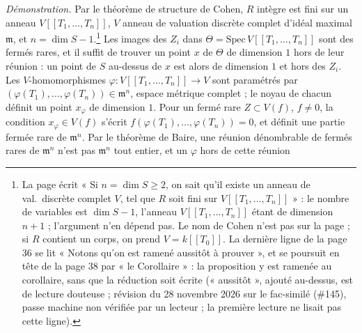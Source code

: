 \documentclass[11pt,a4paper]{article}
\begin{document}
\emph{Démonstration.} Par le théorème de structure de Cohen, $R$ intègre est
fini sur un anneau $V[[T_1, \ldots, T_n]]$, $V$ anneau de valuation discrète
complet d'idéal maximal $\mathfrak{m}$, et $n = \dim S - 1$.\footnote{La page
écrit « Si $n = \dim S \geq 2$, on sait qu'il existe un anneau de val.\
discrète complet $V$, tel que $R$ soit fini sur $V[[T_1, \ldots, T_n]]$ » :
le nombre de variables est $\dim S - 1$, l'anneau $V[[T_1, \ldots, T_n]]$
étant de dimension $n + 1$ ; l'argument n'en dépend pas. Le nom de Cohen
n'est pas sur la page ; si $R$ contient un corps, on prend $V = k[[T_0]]$.
La dernière ligne de la page 36 se lit « Notons qu'on est ramené aussitôt à
prouver », et se poursuit en tête de la page 38 par « le Corollaire » : la
proposition y est ramenée au corollaire, sans que la réduction soit écrite
(« aussitôt », ajouté au-dessus, est de lecture douteuse ; révision du 28 novembre 2026 sur le fac-similé (\#145), passe machine non vérifiée par un lecteur ; la première lecture ne lisait pas cette ligne).} Les images des $Z_i$ dans $\Theta = \mathrm{Spec}\,V[[T_1,
\ldots, T_n]]$ sont des fermés rares, et il suffit de trouver un point $x$ de
$\Theta$ de dimension $1$ hors de leur réunion : un point de $S$ au-dessus de
$x$ est alors de dimension $1$ et hors des $Z_i$. Les $V$-homomorphismes
$\varphi : V[[T_1, \ldots, T_n]] \to V$ sont paramétrés par
$(\varphi(T_1), \ldots, \varphi(T_n)) \in \mathfrak{m}^n$, espace métrique
complet ; le noyau de chacun définit un point $x_\varphi$ de dimension $1$.
Pour un fermé rare $Z \subset V(f)$, $f \neq 0$, la condition
$x_\varphi \in V(f)$ s'écrit $f(\varphi(T_1), \ldots, \varphi(T_n)) = 0$, et
définit une partie fermée rare de $\mathfrak{m}^n$. Par le théorème de Baire,
une réunion dénombrable de fermés rares de $\mathfrak{m}^n$ n'est pas
$\mathfrak{m}^n$ tout entier, et un $\varphi$ hors de cette réunion
\end{document}
